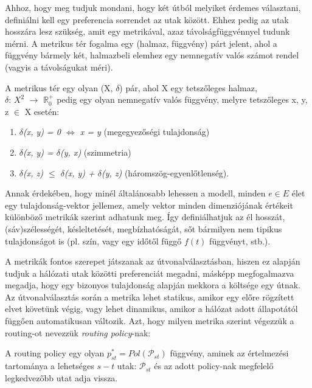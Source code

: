   Ahhoz, hogy meg tudjuk mondani, hogy két útból melyiket érdemes választani, definiálni kell egy preferencia sorrendet az utak között. Ehhez pedig az utak hosszára lesz szükség, amit egy metrikával, azaz távolságfüggvénnyel tudunk mérni. A metrikus tér fogalma egy (halmaz, függvény) párt jelent, ahol a függvény bármely két, halmazbeli elemhez egy nemnegatív valós számot rendel (vagyis a távolságukat méri).

  \begin{definition}\label{eq:MetrikusTerDef}
    A metrikus tér egy olyan (X, $\delta$) pár, ahol X egy tetszőleges halmaz,\\$\delta$: $X^{2}$ $\rightarrow$ $\mathbb{R}^{+}_{0}$ pedig egy olyan nemnegatív valós függvény, melyre tetszőleges x, y, z $\in$ X esetén:
    \begin{enumerate}
    \item \emph{ $\delta$(x, y) = 0 $\Leftrightarrow$ x = y } (megegyezőségi tulajdonság)
    \item \emph{ $\delta$(x, y) = $\delta$(y, x) } (szimmetria)
    \item \emph{ $\delta$(x, z) $\leq$ $\delta$(x, y) + $\delta$(y, z) } (háromszög-egyenlőtlenség).
    \end{enumerate}
  \end{definition}

  Annak érdekében, hogy  minél általánosabb lehessen a modell, minden $e \in E$ élet egy tulajdonság-vektor jellemez, amely vektor minden dimenziójának értékeit különböző metrikák szerint adhatunk meg. Így definiálhatjuk az él hosszát, (sáv)szélességét, késleltetését, megbízhatóságát, sőt bármilyen nem tipikus tulajdonságot is (pl. szín, vagy egy időtől függő $f(t)$ függvényt, stb.).

  A metrikák fontos szerepet játszanak az útvonalválasztásban, hiszen ez alapján tudjuk a hálózati utak közötti preferenciát megadni, másképp megfogalmazva megadja, hogy egy bizonyos tulajdonság alapján mekkora a költsége egy útnak. Az útvonalválasztás során a metrika lehet statikus, amikor egy előre rögzített elvet követünk végig, vagy lehet dinamikus, amikor a hálózat adott állapotától függően automatikusan változik. Azt, hogy milyen metrika szerint végezzük a routing-ot nevezzük \emph{routing policy}-nak:

  \begin{definition} 
    A routing policy egy olyan $p_{st}^{*}=Pol(\mathcal{P}_{st})$ függvény, aminek az értelmezési tartománya a lehetséges $s - t$ utak: $\mathcal{P}_{st}$ és az adott policy-nak megfelelő legkedvezőbb utat adja vissza.
  \end{definition}

